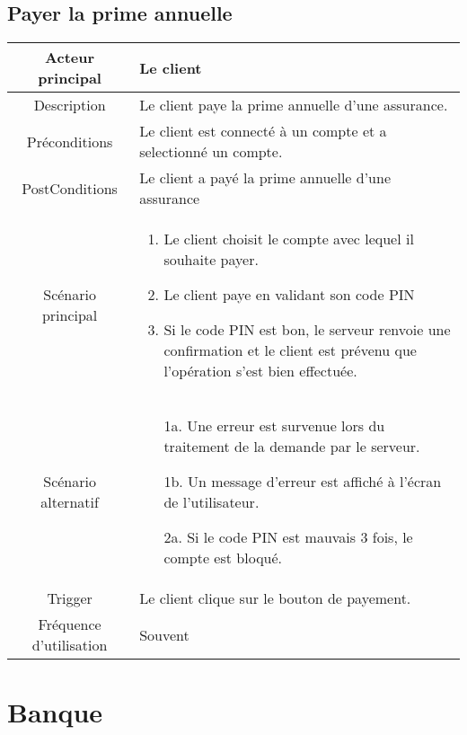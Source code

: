 \documentclass[]{article}
\begin{document}
\subsection{Payer la prime annuelle}
\begin{table}[h]
    \begin{tabular}{|c|p{10cm}|}
       \hline
       Acteur principal&Le client\\
       \hline
       Description&Le client paye la prime annuelle d'une assurance.\\
       \hline
       Préconditions&Le client est connecté à un compte et a selectionné un compte.\\
       \hline
       PostConditions&Le client a payé la prime annuelle d'une assurance\\
       \hline
       Scénario principal& 
             \begin{enumerate}
                \item Le client choisit le compte avec lequel il souhaite payer.
                \item Le client paye en validant son code PIN
                \item Si le code PIN est bon, le serveur renvoie une confirmation et le client est prévenu que l'opération s'est bien effectuée.
             \end{enumerate}     \\
       \hline
       Scénario alternatif&    
       \begin{itemize}
        \item[1a.] Une erreur est survenue lors du traitement de la demande par le serveur.
        \item[1b.] Un message d'erreur est affiché à l'écran de l'utilisateur. 
        \item[2a.] Si le code PIN est mauvais 3 fois, le compte est bloqué.
        \end{itemize}
       \\
       \hline
       Trigger&Le client clique sur le bouton de payement.\\
       \hline
       Fréquence d'utilisation&Souvent\\
       \hline
    \end{tabular}
 \end{table}



\newpage
\section{Banque}
\end{document}
